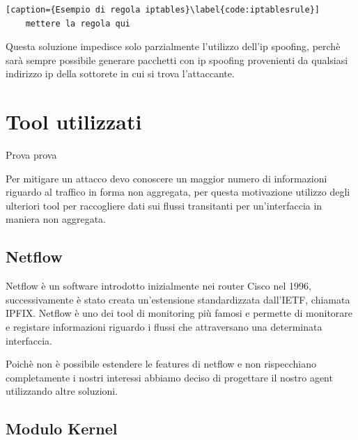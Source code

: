 \begin{lstlisting}[caption={Esempio di regola iptables}\label{code:iptablesrule}]
    mettere la regola qui
\end{lstlisting}
Questa soluzione impedisce solo parzialmente l'utilizzo dell'ip spoofing, perchè sarà sempre possibile generare pacchetti con ip spoofing provenienti da qualsiasi indirizzo ip della sottorete in cui si trova l'attaccante.


\section{Tool utilizzati}
Prova prova

Per mitigare un attacco devo conoscere un maggior numero di informazioni riguardo al traffico in forma non aggregata, per questa motivazione utilizzo degli ulteriori tool per raccogliere dati sui flussi transitanti per un'interfaccia in maniera non aggregata.

\subsection{Netflow}

Netflow è un software introdotto inizialmente nei router Cisco nel 1996, successivamente è stato creata un'estensione standardizzata dall'IETF, chiamata IPFIX. Netflow è uno dei tool di monitoring più famosi e permette di monitorare e registare informazioni riguardo i flussi che attraversano una determinata interfaccia.





Poichè non è possibile estendere le features di netflow e non rispecchiano completamente i nostri interessi abbiamo deciso di progettare il nostro agent utilizzando altre soluzioni.

\subsection{Modulo Kernel}


